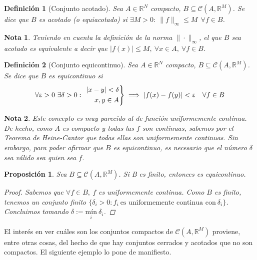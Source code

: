\documentclass[11pt, a4paper]{article}
\let\epsilon\upvarepsilon
\theoremstyle{theorem-style}
\newtheorem*{nprop}{Proposición}
\theoremstyle{definition-style}
\newtheorem*{ndef}{Definición}
\theoremstyle{remark-style}
\newtheorem*{nota}{Nota}
\theoremstyle{example-style}
\newenvironment{rcases}
  {\left.\begin{aligned}}
  {\end{aligned}\right\rbrace}
\begin{document}
\begin{ndef}[Conjunto acotado]
	Sea $A \in \mathbb{R}^N$ compacto, $B \subseteq \mathcal{C}(A,\mathbb{R}^M)$. Se dice que $B$ es acotado (o equiacotado) si $\exists M > 0: \ \|f\|_{\infty} \le M \ \ \forall f \in B$.
\end{ndef}

\begin{nota}
	Teniendo en cuenta la definición de la norma $\|\cdot\|_\infty$, el que $B$ sea acotado es equivalente a decir que $|f(x)|\le M,\ \forall x \in A,\ \forall f \in B$.
\end{nota}

\begin{ndef}[Conjunto equicontinuo]
    Sea $A \in \mathbb{R}^N$ compacto, $B \subseteq \mathcal{C}(A,\mathbb{R}^M)$. Se dice que $B$ es equicontinuo si $$\forall \epsilon > 0\ \exists \delta > 0:\ \begin{rcases} |x-y| < \delta\\ x,y \in A \end{rcases} \implies |f(x) - f(y)| < \epsilon \quad \forall f \in B$$
\end{ndef}

\begin{nota}
	Este concepto es muy parecido al de función uniformemente continua. De hecho, como $A$ es compacto y todas las $f$ son continuas, sabemos por el \textit{Teorema de Heine-Cantor} que todas ellas son uniformemente continuas. Sin embargo, para poder afirmar que $B$ es equicontinuo, es necesario que el número $\delta$ sea válido sea quien sea $f$. 
\end{nota}

\begin{nprop} Sea $B \subseteq \mathcal{C}(A,\mathbb{R}^M)$. Si B es finito, entonces es equicontinuo.

\begin{proof}
	Sabemos que $\forall f \in B,\ f$ es uniformemente continua. Como $B$ es finito, tenemos un conjunto finito $\{\delta_i > 0 : f_i \ \text{es uniformemente continua con} \ \delta_i\}$. Concluimos tomando $\delta := \underset{i}{\text{mín}} \ \delta_i$.
\end{proof}
\end{nprop}

El interés en ver cuáles son los conjuntos compactos de $\mathcal{C}(A,\mathbb{R}^M)$ proviene, entre otras cosas, del hecho de que hay conjuntos cerrados y acotados que no son compactos. El siguiente ejemplo lo pone de manifiesto.
\end{document}
